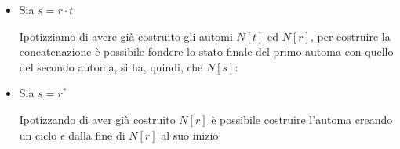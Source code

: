 {\begin{itemize}
\begin{center}
\begin{tikzpicture}[shorten >=1pt, node distance=2cm, on grid, auto]
                
            \end{tikzpicture}
            
        \end{center}

        Algebricamente si può dimostrare che $\mathcal{L}[r|t]=\mathcal{L}[t]\cup \mathcal{L}[r]$

        e per ipotesi induttiva si ha:
        \[
            \mathcal{L}[t]\cup \mathcal{L}[r] =L[N[r]]\cup L[N[t]] =L[N[r|t]]
        \]
        \item Sia $s=r\cdot t$
        
        Ipotizziamo di avere già costruito gli automi $N[t]$ ed $N[r]$, per costruire la concatenazione è possibile fondere lo stato finale del primo automa con quello del secondo automa, si ha, quindi, che $N[s]$:

        \begin{center}
        \end{center}


        \item Sia $s=r^*$
        
        Ipotizzando di aver già costruito $N[r]$ è possibile costruire l'automa creando un ciclo $\epsilon$ dalla fine di $N[r]$ al suo inizio

        \begin{center}
\end{center}
\end{itemize}}
